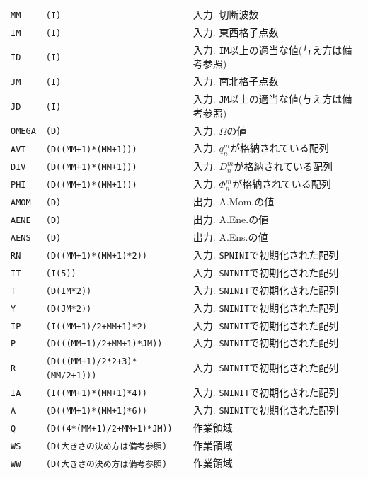 \documentclass[a4j,fleqn]{jarticle}
\begin{document}
\begin{enumerate}
\begin{tabular}{lll}
{\tt MM} & {\tt (I)} & 入力. 切断波数\\
{\tt IM} & {\tt (I)} & 入力. 東西格子点数\\
{\tt ID} & {\tt (I)} & 入力. {\tt IM}以上の適当な値(与え方は備考参照)\\
{\tt JM} & {\tt (I)} & 入力. 南北格子点数\\
{\tt JD} & {\tt (I)} & 入力. {\tt JM}以上の適当な値(与え方は備考参照)\\
{\tt OMEGA} & {\tt (D)} 
& 入力. $\Omega$の値\\
{\tt AVT} & {\tt (D((MM+1)*(MM+1)))} 
& 入力. $q^m_n$が格納されている配列\\
{\tt DIV} & {\tt (D((MM+1)*(MM+1)))} 
& 入力. $D^m_n$が格納されている配列\\
{\tt PHI} & {\tt (D((MM+1)*(MM+1)))} 
& 入力. $\Phi^m_n$が格納されている配列\\
{\tt AMOM} & {\tt (D)} 
& 出力. A.Mom.の値\\
{\tt AENE} & {\tt (D)}
& 出力. A.Ene.の値\\
{\tt AENS} & {\tt (D)} 
& 出力. A.Ens.の値\\
{\tt RN} & {\tt (D((MM+1)*(MM+1)*2))} 
& 入力. {\tt SPNINI}で初期化された配列\\
{\tt IT}  & {\tt (I(5))}    & 入力. {\tt SNINIT}で初期化された配列\\
{\tt T}   & {\tt (D(IM*2))} & 入力. {\tt SNINIT}で初期化された配列\\
{\tt Y}   & {\tt (D(JM*2))} & 入力. {\tt SNINIT}で初期化された配列\\
{\tt IP}  & {\tt (I((MM+1)/2+MM+1)*2)} 
             & 入力. {\tt SNINIT}で初期化された配列\\
{\tt P}  & {\tt (D(((MM+1)/2+MM+1)*JM))} 
             & 入力. {\tt SNINIT}で初期化された配列\\
{\tt R}  & {\tt (D(((MM+1)/2*2+3)*(MM/2+1)))}
             & 入力. {\tt SNINIT}で初期化された配列\\
{\tt IA}  & {\tt (I((MM+1)*(MM+1)*4))} 
             & 入力. {\tt SNINIT}で初期化された配列\\
{\tt A}  & {\tt (D((MM+1)*(MM+1)*6))}
             & 入力. {\tt SNINIT}で初期化された配列\\
{\tt Q}  & {\tt (D((4*(MM+1)/2+MM+1)*JM))} 
             & 作業領域\\
{\tt WS}  & {\tt (D(大きさの決め方は備考参照)} & 作業領域\\
{\tt WW}  & {\tt (D(大きさの決め方は備考参照)} & 作業領域
\end{tabular}


\end{enumerate}
\end{document}
